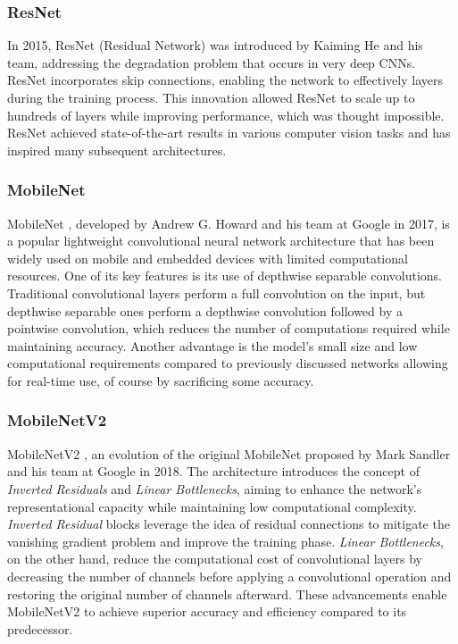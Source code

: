 \subsubsection{ResNet}

In 2015, ResNet (Residual Network) \cite{He2015} was introduced by Kaiming He
and his team, addressing the degradation problem that occurs in very deep CNNs.
ResNet incorporates skip connections, enabling the network to effectively
 layers during the training process. This innovation allowed ResNet to
scale up to hundreds of layers while improving performance, which was thought
impossible.  ResNet achieved state-of-the-art results in various computer vision
tasks and has inspired many subsequent architectures.


\subsubsection{MobileNet}

MobileNet \cite{Howard2017}, developed by Andrew G. Howard and his team at
Google in 2017, is a popular lightweight convolutional neural network
architecture that has been widely used on mobile and embedded devices with
limited computational resources. One of its key features is its use of depthwise
separable convolutions. Traditional convolutional layers perform a full
convolution on the input, but depthwise separable ones perform a depthwise
convolution followed by a pointwise convolution, which reduces the number of
computations required while maintaining accuracy. Another advantage is the
model's small size and low computational requirements compared to previously
discussed networks allowing for real-time use, of course by sacrificing some
accuracy.


\subsubsection{MobileNetV2}

MobileNetV2 \cite{Sandler2018}, an evolution of the original MobileNet
proposed by Mark Sandler and his team at Google in 2018. The architecture
introduces the concept of \textit{Inverted Residuals} and \textit{Linear
Bottlenecks}, aiming to enhance the network's representational capacity while
maintaining low computational complexity. \textit{Inverted Residual} blocks
leverage the idea of residual connections to mitigate the vanishing gradient
problem and improve the training phase. \textit{Linear Bottlenecks}, on the
other hand, reduce the computational cost of convolutional layers by decreasing
the number of channels before applying a convolutional operation and restoring
the original number of channels afterward. These advancements enable MobileNetV2
to achieve superior accuracy and efficiency compared to its predecessor.


